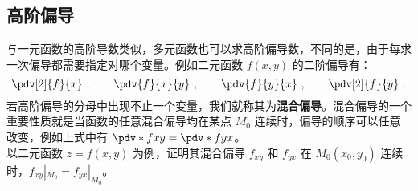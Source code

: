 \subsection{高阶偏导}
与一元函数的高阶导数类似，多元函数也可以求高阶偏导数，不同的是，由于每求一次偏导都需要指定对哪个变量。例如二元函数 $f(x,y)$ 的二阶偏导有：
\begin{equation}
\pdv[2]{f}{x}~, \qquad
\pdv{f}{x}{y}~, \qquad
\pdv{f}{y}{x}~, \qquad
\pdv[2]{f}{y}~.
\end{equation}
若高阶偏导的分母中出现不止一个变量，我们就称其为\textbf{混合偏导}。混合偏导的一个重要性质就是当函数的任意混合偏导均在某点 $M_0$ 连续时，偏导的顺序可以任意改变，例如上式中有 $\pdv*{f}{x}{y} = \pdv*{f}{y}{x}$。\\
以二元函数 $z=f(x,y)$ 为例，证明其混合偏导 $f_{xy}$ 和 $f_{yx}$ 在 $M_0(x_0,y_0)$ 连续时，$f_{xy}|_{M_0}=f_{yx}|_{M_0}$。\\


